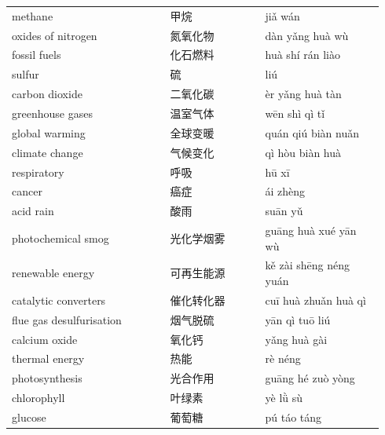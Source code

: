 \documentclass[11pt]{article}
\begin{document}
\begin{longtable}{@{}p{0.40\linewidth}p{0.24\linewidth}p{0.30\linewidth}@{}}
methane & 甲烷 & jiǎ wán \\
oxides of nitrogen & 氮氧化物 & dàn yǎng huà wù \\
fossil fuels & 化石燃料 & huà shí rán liào \\
sulfur & 硫 & liú \\
carbon dioxide & 二氧化碳 & èr yǎng huà tàn \\
greenhouse gases & 温室气体 & wēn shì qì tǐ \\
global warming & 全球变暖 & quán qiú biàn nuǎn \\
climate change & 气候变化 & qì hòu biàn huà \\
respiratory & 呼吸 & hū xī \\
cancer & 癌症 & ái zhèng \\
acid rain & 酸雨 & suān yǔ \\
photochemical smog & 光化学烟雾 & guāng huà xué yān wù \\
renewable energy & 可再生能源 & kě zài shēng néng yuán \\
catalytic converters & 催化转化器 & cuī huà zhuǎn huà qì \\
flue gas desulfurisation & 烟气脱硫 & yān qì tuō liú \\
calcium oxide & 氧化钙 & yǎng huà gài \\
thermal energy & 热能 & rè néng \\
photosynthesis & 光合作用 & guāng hé zuò yòng \\
chlorophyll & 叶绿素 & yè lǜ sù \\
glucose & 葡萄糖 & pú táo táng \\
\end{longtable}
\end{document}
